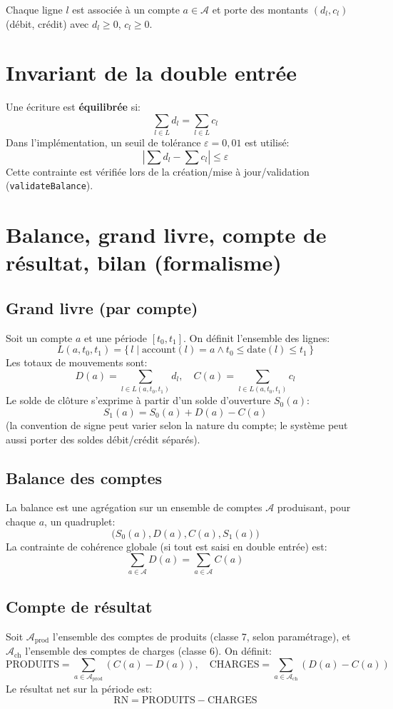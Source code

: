 \documentclass[12pt,a4paper]{report}
\begin{document}
Chaque ligne \(l\) est associée à un compte \(a \in \mathcal{A}\) et porte des montants \((d_l, c_l)\) (débit, crédit) avec \(d_l \ge 0\), \(c_l \ge 0\).

\section{Invariant de la double entrée}
Une écriture est \textbf{équilibrée} si:
\[
\sum_{l \in L} d_l = \sum_{l \in L} c_l
\]
Dans l'implémentation, un seuil de tolérance \(\varepsilon = 0{,}01\) est utilisé:
\[
\left|\sum d_l - \sum c_l\right| \le \varepsilon
\]
Cette contrainte est vérifiée lors de la création/mise à jour/validation (\texttt{validateBalance}).

\section{Balance, grand livre, compte de résultat, bilan (formalisme)}
\subsection{Grand livre (par compte)}
Soit un compte \(a\) et une période \([t_0,t_1]\). On définit l'ensemble des lignes:
\[
L(a,t_0,t_1)=\{\,l \mid \mathrm{account}(l)=a \wedge t_0 \le \mathrm{date}(l) \le t_1\,\}
\]
Les totaux de mouvements sont:
\[
D(a)=\sum_{l \in L(a,t_0,t_1)} d_l,\quad C(a)=\sum_{l \in L(a,t_0,t_1)} c_l
\]
Le solde de clôture s'exprime à partir d'un solde d'ouverture \(S_0(a)\):
\[
S_1(a)=S_0(a)+D(a)-C(a)
\]
(la convention de signe peut varier selon la nature du compte; le système peut aussi porter des soldes débit/crédit séparés).

\subsection{Balance des comptes}
La balance est une agrégation sur un ensemble de comptes \(\mathcal{A}\) produisant, pour chaque \(a\), un quadruplet:
\[
\big(S_0(a), D(a), C(a), S_1(a)\big)
\]
La contrainte de cohérence globale (si tout est saisi en double entrée) est:
\[
\sum_{a \in \mathcal{A}} D(a) = \sum_{a \in \mathcal{A}} C(a)
\]

\subsection{Compte de résultat}
Soit \(\mathcal{A}_{\text{prod}}\) l'ensemble des comptes de produits (classe 7, selon paramétrage), et \(\mathcal{A}_{\text{ch}}\) l'ensemble des comptes de charges (classe 6).
On définit:
\[
\mathrm{PRODUITS}=\sum_{a \in \mathcal{A}_{\text{prod}}} (C(a)-D(a)),\quad
\mathrm{CHARGES}=\sum_{a \in \mathcal{A}_{\text{ch}}} (D(a)-C(a))
\]
Le résultat net sur la période est:
\[
\mathrm{RN}=\mathrm{PRODUITS}-\mathrm{CHARGES}
\]
\end{document}

